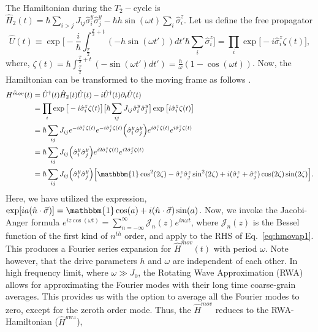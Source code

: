 \documentclass[12pt]{iopart}
\begin{document}
The Hamiltonian during the $T_2-$cycle is $\displaystyle \hat{H}_2(t) = \hbar\sum_{i>j} J_{ij}\hat{\sigma}^y_i\hat{\sigma}^y_j - \hbar h \sin(\omega t) \sum_i \hat{\sigma}^z_i$. Let us define the free propagator 
\begin{equation}
    \hat{U}(t) \equiv \exp \bigg[-\frac{i}{\hbar}\int_{\frac{T}{2}}^{\frac{T}{2}+t} (-h \sin(\omega t'))dt' \hbar\sum_i\hat{\sigma}^z_i\bigg]
    =\prod_{i} \exp\big[-i \hat{\sigma}^z_i\zeta(t)\big],
\end{equation}
where, $\displaystyle \zeta (t) = h\int_{\frac{T}{2}}^{\frac{T}{2}+t}  (-\sin(\omega t')dt') =\frac{h}{\omega}(1-\cos(\omega t))$.
Now, the Hamiltonian can be transformed to the moving frame as follows \cite{haldar_statistical_2022}.
\begin{align}
    \hat{H^{mov}}(t) &= \hat{U}^\dagger(t) \hat{H}_2(t) \hat{U}(t)- i \hat{U}^\dagger(t) \partial_t \hat{U}(t) \nonumber\\
    &= \prod_{i} \exp\big[-i\hat{\sigma}^z_i \zeta(t)\big] \big[\hbar\sum_{ij}J_{ij}\hat{\sigma}^y_i\hat{\sigma}^y_j\big] \exp\big[ i\hat{\sigma}^z_i \zeta(t)\big]\nonumber\\
    &= \hbar\sum_{ij} J_{ij} e^{-i\hat{\sigma}^z_i \zeta(t)} e^{-i\hat{\sigma}^z_j  \zeta(t)}\Big(\hat{\sigma}^y_i\hat{\sigma}^y_j\Big)e^{i\hat{\sigma}^z_i \zeta(t)} e^{i\hat{\sigma}^z_j \zeta(t)}\nonumber\\
    &= \hbar\sum_{ij} J_{ij} \Big(\hat{\sigma}^y_i\hat{\sigma}^y_j\Big)e^{i2\hat{\sigma}^z_i \zeta(t)} e^{i2\hat{\sigma}^z_j \zeta(t)}\nonumber\\
    &= \hbar\sum_{ij} J_{ij} \Big(\hat{\sigma}^y_i\hat{\sigma}^y_j\Big) \Big[\mathbbm{1}\cos^2(2\zeta) -\hat{\sigma}^z_i\hat{\sigma}^z_j \sin^2(2\zeta) + i (\hat{\sigma}^z_i + \hat{\sigma}^z_j)\cos(2\zeta)\sin(2\zeta)\Big].
    \label{eq:hmovap1}
\end{align}
Here, we have utilized the expression, $\displaystyle \exp[ia(\hat{n}\cdot\vec{\sigma})] = \mathbbm{1} \cos(a) + i (\hat{n}\cdot\vec{\sigma})\sin(a)$.	Now, we invoke the Jacobi-Anger formula $\displaystyle e^{iz\cos(\omega t)} = \sum_{n=-\infty}^{\infty}\mathcal{J}_n(z)e^{in\omega t}$\cite{arfkenmath}, where $\mathcal{J}_n(z)$ is the Bessel function of the first kind of $n^{th}$ order, and apply to the RHS of  Eq.~\ref{eq:hmovap1}. This produces a Fourier series expansion for 
$\hat{H}^{mov}(t)$ with period $\omega$. Note however, that the drive parameters $h$ and $\omega$ are independent of each other. In high frequency limit, where $\omega \gg J_0$, the Rotating Wave Approximation (RWA) allows for approximating the Fourier modes with their long time coarse-grain averages. This provides us with the option to average all the Fourier modes to zero, except for the zeroth order mode. Thus, the $\hat{H}^{mov}$ reduces to the RWA-Hamiltonian ($\hat{H}^{_{RWA}}$),
\end{document}
